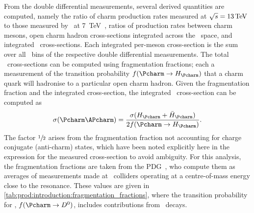 \begin{table}
  \centering
  \caption{%
      Branching ratios for the different decay 
      modes~\cite{PDG2014,Alexander:2008aa}.
      The \DspTophipi\ branching fraction includes the branching fraction of 
      \phiToKK\@.
  }
  \label{tab:prod:introduction:branching_ratios}
  
\end{table}

From the double differential measurements, several derived quantities are 
computed, namely the ratio of charm production rates measured at $\sqrts = 
\SI{13}{\TeV}$ to those measured by \lhcb\ at 
\SI{7}{\TeV}~\cite{LHCb-PAPER-2012-041}, ratios of production rates between 
charm mesons, open charm hadron cross-sections integrated across the \pTy\ 
space, and integrated \ccbar\ cross-sections.
Each integrated per-meson cross-section is the sum over all \pTy\ bins of the 
respective double differential measurements.
The total \ccbar\ cross-sections can be computed using fragmentation fractions; 
each a measurement of the transition probability $f(\cToHc)$ that a charm quark 
will hadronise to a particular open charm hadron.
Given the fragmentation fraction and the integrated cross-section, the 
integrated \ccbar\ cross-section can be computed as
\begin{equation}
  \xsec{(\ccbar)} = \frac{\xsec(\PHc + \APHc)}{2f(\cToHc)}.
  \label{eqn:prod:introduction:ccbar_cross_section}
\end{equation}
The factor $\sfrac{1}{2}$ arises from the fragmentation fraction not accounting 
for charge conjugate (anti-charm) states, which have been noted explicitly here 
in the expression for the measured cross-section to avoid ambiguity.
For this analysis, the fragmentation fractions are taken from the 
\ac{PDG}~\cite{PDG2008}, who compute them as averages of measurements made at 
\epem\ colliders operating at a centre-of-mass energy close to the 
\PUpsilonFourS resonance.
These values are given in \cref{tab:prod:introduction:fragmentation_fractions}, 
where the transition probability for \PDzero, $f(\decay{\Pcharm}{\PDzero})$, 
includes contributions from \DstToDzpi\ decays.

\begin{table}
  \caption[Charm hadron fragmentation fractions]{%
    Charm hadron fragmentation fractions~\cite{PDG2008}.
    Here, \PHc\ does not include the charge conjugate state.
  }
  \label{tab:prod:introduction:fragmentation_fractions}
  \centering
  
\end{table}

